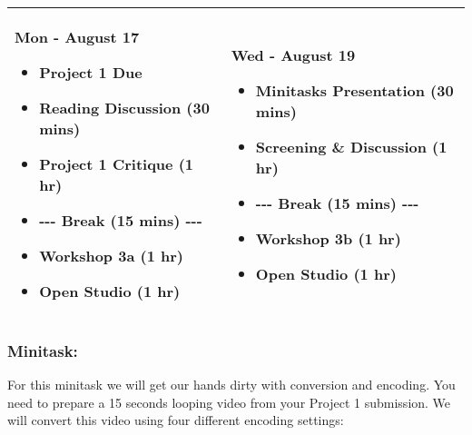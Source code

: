 \documentclass[10pt,letter,english]{article}
\begin{document}
\begin{longtable}[]{@{}ll@{}}
      \toprule
      \endhead
      \begin{minipage}[t]{0.47\columnwidth}\raggedright
            \textbf{{Mon - August 17}}

            \begin{itemize}
                  \item
                        \textbf{Project 1 Due}
                  \item
                        Reading Discussion (30 mins)
                  \item
                        Project 1 Critique (1 hr)
                  \item
                        -\/-\/- Break (15 mins) -\/-\/-
                  \item
                        Workshop 3a (1 hr)
                  \item
                        Open Studio (1 hr)
            \end{itemize}\strut
      \end{minipage} & \begin{minipage}[t]{0.47\columnwidth}\raggedright
            \textbf{{Wed - August 19}}

            \begin{itemize}
                  \item
                        Minitasks Presentation (30 mins)
                  \item
                        Screening \& Discussion (1 hr)
                  \item
                        -\/-\/- Break (15 mins) -\/-\/-
                  \item
                        Workshop 3b (1 hr)
                  \item
                        Open Studio (1 hr)
            \end{itemize}\strut
      \end{minipage}\tabularnewline
      \bottomrule
\end{longtable}

\hypertarget{minitask-2}{%
      \subsubsection*{\texorpdfstring{Minitask:
            }{Minitask: }}\label{minitask-2}}

For this minitask we will get our hands dirty with conversion and encoding. You need to prepare a 15 seconds looping video from your Project 1 submission. We will convert this video using four different encoding settings:
\end{document}
